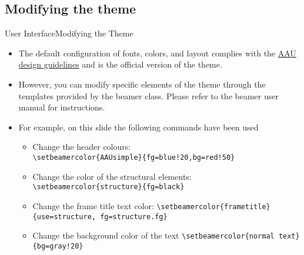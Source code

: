 \documentclass[10pt]{beamer}
\newcommand{\chref}[2]{%
  \href{#1}{{\usebeamercolor[bg]{AAUsimple}#2}}%
}
\begin{document}
\subsection{Modifying the theme}
{
\begin{frame}{User Interface}{Modifying the Theme}
  \begin{itemize}
    \item<1-> The default configuration of fonts, colors, and layout complies with the \chref{http://aau.designguiden.dk}{AAU design guidelines} and is the \alert{official} version of the theme.
    \item<2-> However, you can modify specific elements of the theme through the templates provided by the beamer class. Please refer to the beamer user manual for instructions.
    \item<3-> For example, on this slide the following commands have been used
      \begin{itemize}
        \item Change the header colours:\\
        {\tt \textbackslash setbeamercolor\{AAUsimple\}\{fg=blue!20,bg=red!50\}}
        \item Change the color of the structural elements:\\
        {\tt \textbackslash setbeamercolor\{structure\}\{fg=black\}}\\
        \item Change the frame title text color:
        {\tt \textbackslash setbeamercolor\{frametitle\}\{use=structure, fg=structure.fg\}}
        \item Change the background color of the text
        {\tt \textbackslash setbeamercolor\{normal text\}\{bg=gray!20\}}
      \end{itemize}
  \end{itemize}
\end{frame}}
\end{document}
